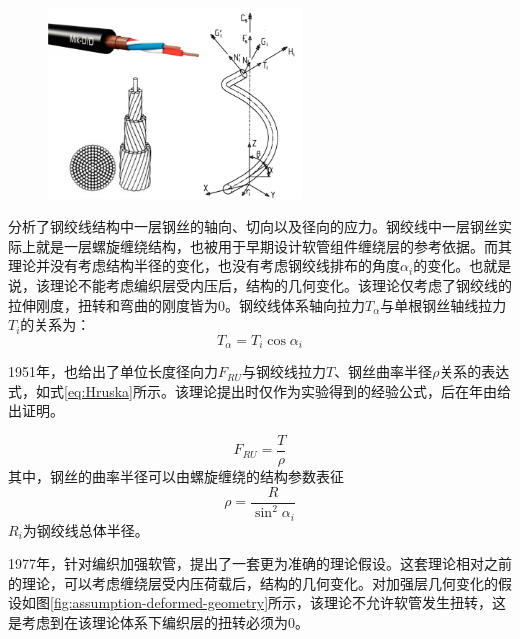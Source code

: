 \begin{figure}[!htbp]
	\centering
	\includegraphics[width=0.6\textwidth]{figure/chap1/helical-strands}
	\label{fig:helical-strands}
\end{figure}



\citeauthor{hruska1951calculation}\cite{hruska1951calculation,hruska1952radial,hruska1953tangential}分析了钢绞线结构中一层钢丝的轴向、切向以及径向的应力。钢绞线中一层钢丝实际上就是一层螺旋缠绕结构，也被用于早期设计软管组件缠绕层的参考依据。而其理论并没有考虑结构半径的变化，也没有考虑钢绞线排布的角度$ \alpha_i $的变化。也就是说，该理论不能考虑编织层受内压后，结构的几何变化。该理论仅考虑了钢绞线的拉伸刚度，扭转和弯曲的刚度皆为0。钢绞线体系轴向拉力$ T_\alpha $与单根钢丝轴线拉力$ T_i $的关系为：
\begin{equation}
T_\alpha = T_i \cos{\alpha_i}
\end{equation}

1951年，\citeauthor{hruska1951calculation}也给出了单位长度径向力$ F_{RU} $与钢绞线拉力$ T $、钢丝曲率半径$ \rho $关系的表达式，如式\ref{eq:Hruska}所示。该理论提出时仅作为实验得到的经验公式，后在\citeyear{machida1973}年由\citeauthor{machida1973}\cite{machida1973}给出证明。

\begin{equation}\label{eq:Hruska}
{F_{RU}} = \frac{T}{\rho }
\end{equation}
其中，钢丝的曲率半径可以由螺旋缠绕的结构参数表征
\begin{equation}
\rho  = \frac{R}{{{{\sin }^2}{\alpha _i}}}
\end{equation}
$ R_i $为钢绞线总体半径。


1977年，\citeauthor{Entwistle1977}\cite{Entwistle1977}针对编织加强软管，提出了一套更为准确的理论假设。这套理论相对之前的理论，可以考虑缠绕层受内压荷载后，结构的几何变化。\citeauthor{Entwistle1977}对加强层几何变化的假设如图\ref{fig:assumption-deformed-geometry}所示，该理论不允许软管发生扭转，这是考虑到在该理论体系下编织层的扭转必须为0。

